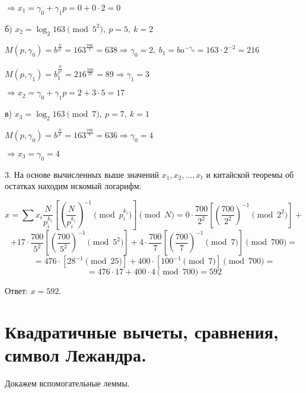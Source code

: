 \documentclass[a4paper,11pt,openany]{book}
\begin{document}
\noindent $\Rightarrow x_1 = \gamma_0 + \gamma_1 p = 0 + 0 \cdot 2 = 0$

б) $x_2 = \log_2 163 \pmod { 5^2 }, \ p = 5, \ k = 2$

\noindent $M(p, \gamma_0) = b ^ { \frac{N}{p} } = 163 ^ { \frac{700}{5} } = 638 \Rightarrow \gamma_0 = 2, \ b_1 = ba^{-\gamma_0} = 163 \cdot 2 ^ {-2} = 216$

\noindent $M(p, \gamma_1) = b_1 ^ { \frac{N}{p^2} } = 216 ^ { \frac{700}{25} } = 89 \Rightarrow \gamma_1 = 3$

\noindent $\Rightarrow x_2 = \gamma_0 + \gamma_1 p = 2 + 3 \cdot 5 = 17$

в) $x_3 = \log_2 163 \pmod { 7 }, \ p = 7, \ k = 1$

\noindent $M(p, \gamma_0) = b ^ { \frac{N}{p} } = 163 ^ { \frac{700}{7} } = 636 \Rightarrow \gamma_0 = 4$

\noindent $\Rightarrow x_3 = \gamma_0 = 4$

3. На основе вычисленных выше значений $x_1, x_2, ..., x_t$ и китайской теоремы об остатках находим искомый логарифм:

$$x = \sum x_i \frac{N}{p_i^{k_i}} [ ( \frac{N}{p_i^{k_i}} ) ^ {-1} \!\!\!\!\pmod {p_i^{k_i}} ] \!\!\!\!\pmod N = 0 \cdot \frac{700}{2^2} [ (\frac{700}{2^2}) ^ {-1} \!\!\!\!\pmod {2^2}] + $$ 
$$+ 17 \cdot \frac{700}{5^2} [ (\frac{700}{5^2}) ^ {-1} \!\!\!\!\pmod {5^2}] + 4 \cdot \frac{700}{7} [ (\frac{700}{7}) ^ {-1} \!\!\!\!\pmod 7]  \pmod {700} = $$
$$ = 476 \cdot [ 28 ^ {-1} \!\!\!\!\pmod {25}] + 400 \cdot [100 ^ {-1} \!\!\!\!\pmod 7] \pmod {700} = $$
$$ = 476 \cdot 17 + 400 \cdot 4 \pmod {700} = 592$$

\noindent Ответ: $x = 592$.

\section{Квадратичные вычеты, сравнения, символ Лежандра.}

Докажем вспомогательные леммы.

\end{document}
